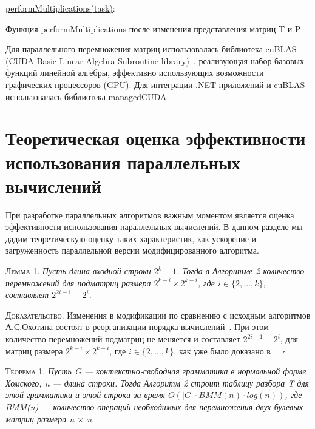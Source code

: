 \documentclass[14pt]{matmex-diploma}
\begin{document}
\begin{algorithm}[H]
\SetAlgoNoLine
{}
\BlankLine
\underline{performMultiplications(task)}{:}{
 
 \BlankLine
 }
\caption{ Функция performMultiplications после изменения представления матриц T и P}
\end{algorithm}

\BlankLine

Для параллельного перемножения матриц использовалась библиотека cuBLAS (CUDA Basic Linear Algebra Subroutine library)~\cite{cublas}, реализующая набор базовых функций линейной алгебры, эффективно использующих возможности графических процессоров (GPU). Для интеграции .NET-приложений и cuBLAS использовалась библиотека \linebreak managedCUDA~\cite{managedcuda}.

\section{Теоретическая оценка эффективности использования параллельных вычислений}

При разработке параллельных алгоритмов важным моментом является оценка эффективности использования параллельных вычислений. В данном разделе мы дадим теоретическую оценку таких характеристик, как ускорение и загруженность параллельной версии модифицированного алгоритма.

\textsc{Лемма 1.} 
\textit{Пусть длина входной строки $2^k - 1$. Тогда в Алгоритме 2 количество перемножений для подматриц размера $2^{k - i} \times 2^{k - i}$, где $i \in \{2, \ldots, k\}$, составляет $2^{2i - 1} - 2^{i}$.}

\textsc{Доказательство.}
Изменения в модификации по сравнению с исходным алгоритмов А.С.Охотина состоят в реорганизации порядка вычислений~\cite{alg}. При этом количество перемножений подматриц не меняется и составляет $2^{2i - 1} - 2^{i}$, для матриц размера $2^{k - i} \times 2^{k - i}$, где $i \in \{2, \ldots, k\}$, как уже было доказано в ~\cite{okh}. $\square$

\textsc{Теорема 1.} 
\textit{Пусть G --- контекстно-свободная грамматика в нормальной форме Хомского, n --- длина строки. Тогда  Алгоритм 2 строит таблицу разбора T для этой грамматики и этой строки за время $O(|G|\cdot BMM(n)\cdot log(n))$, где BMM(n) --- количество операций необходимых для перемножения двух булевых матриц размера n $\times$ n.}
\end{document}
